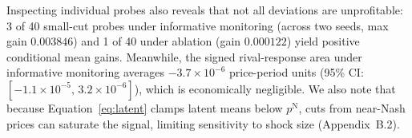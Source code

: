 Inspecting individual probes also reveals that not all deviations are unprofitable: 3 of 40 small-cut probes under informative monitoring (across two seeds, max gain $0.003846$) and 1 of 40 under ablation (gain $0.000122$) yield positive conditional mean gains. Meanwhile, the signed rival-response area under informative monitoring averages $-3.7\times 10^{-6}$ price-period units (95\% CI: $[-1.1\times 10^{-5},\,3.2\times 10^{-6}]$), which is economically negligible. We also note that because Equation~\eqref{eq:latent} clamps latent means below $p^{\mathrm{N}}$, cuts from near-Nash prices can saturate the signal, limiting sensitivity to shock size (Appendix~B.2).

